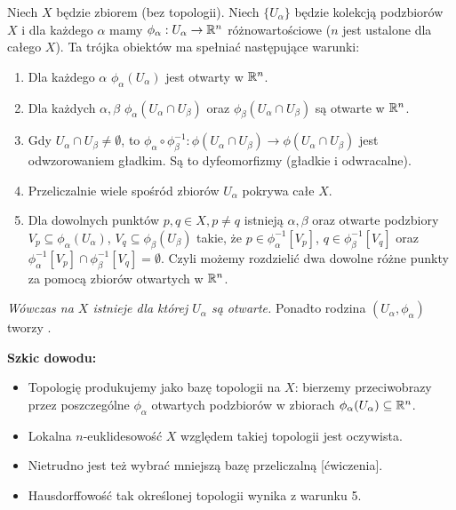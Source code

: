\begin{lemat}
    Niech $X$ będzie zbiorem (bez topologii). Niech $\{U_\alpha\}$ będzie kolekcją podzbiorów $X$ i dla każdego $\alpha$ mamy $\phi_\alpha:U_\alpha\to\mathbb{R}^n$ różnowartościowe ($n$ jest ustalone dla całego $X$). Ta trójka obiektów ma spełniać następujące warunki:
    \begin{enumerate}
        \item  Dla każdego $\alpha$ $\phi_\alpha(U_\alpha)$ jest otwarty w $\mathbb{R}^n$.
        \item Dla każdych $\alpha,\beta$ $\phi_\alpha(U_\alpha\cap U_\beta)$ oraz $\phi_\beta(U_\alpha\cap U_\beta)$ są otwarte w $\mathbb{R}^n$.
        \item Gdy $U_\alpha\cap U_\beta\neq\emptyset$, to $\phi_\alpha\circ\phi_\beta^{-1}:\phi(U_\alpha\cap U_\beta)\to\phi(U_\alpha\cap U_\beta)$ jest odwzorowaniem gładkim. Są to dyfeomorfizmy (gładkie i odwracalne).
        \item Przeliczalnie wiele spośród zbiorów $U_\alpha$ pokrywa całe $X$.
        \item Dla dowolnych punktów $p,q\in X,p\neq q$ istnieją $\alpha,\beta$ oraz otwarte podzbiory $V_p\subseteq\phi_\alpha(U_\alpha)$, $V_q\subseteq\phi_\beta(U_\beta)$ takie, że $p\in\phi_\alpha^{-1}[V_p]$, $q\in\phi_\beta^{-1}[V_q]$ oraz $\phi_\alpha^{-1}[V_p]\cap\phi_\beta^{-1}[V_q]=\emptyset$. Czyli możemy rozdzielić dwa dowolne różne punkty za pomocą zbiorów otwartych w $\mathbb{R}^n$.
    \end{enumerate}
\emph{Wówczas na $X$ istnieje  dla której $U_\alpha$ są otwarte.} Ponadto rodzina $(U_\alpha,\phi_\alpha)$ tworzy .
\end{lemat}

\textbf{Szkic dowodu:} 
\begin{itemize}
    \item Topologię produkujemy jako bazę topologii na $X$: bierzemy przeciwobrazy przez poszczególne $\phi_\alpha$ otwartych podzbiorów w zbiorach $\phi_\alpha(U_\alpha)\subseteq\mathbb{R}^n$.
    \item Lokalna $n$-euklidesowość $X$ względem takiej topologii jest oczywista.
    \item Nietrudno jest też wybrać mniejszą bazę przeliczalną [ćwiczenia]. 
    \item Hausdorffowość tak określonej topologii wynika z warunku 5.
\end{itemize}
\proofend
\medskip


